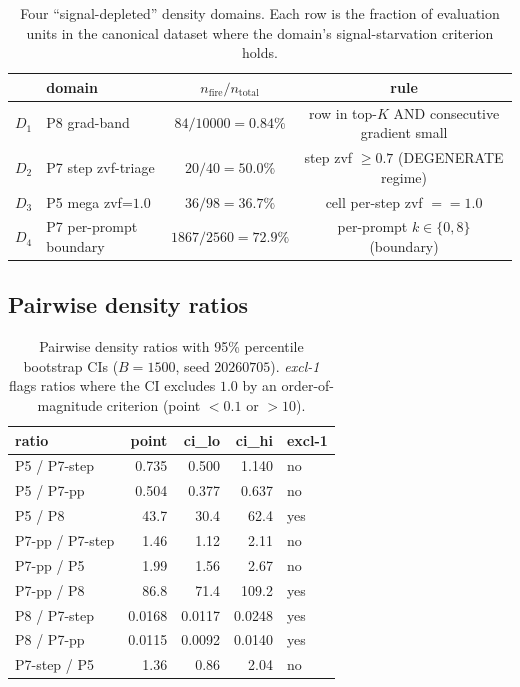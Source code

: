 \documentclass{article}
\begin{document}
\begin{table}[h]
\centering\small
\caption{Four ``signal-depleted'' density domains. Each row is the
fraction of evaluation units in the canonical dataset where the
domain's signal-starvation criterion holds.}
\label{tab:synth-four-domain}
\begin{tabular}{llcc}
\toprule
& domain & $n_{\mathrm{fire}} / n_{\mathrm{total}}$ & rule \\
\midrule
$D_1$ & P8 grad-band        & $84 / 10000 = 0.84\%$ & row in top-$K$ AND consecutive gradient small \\
$D_2$ & P7 step zvf-triage  & $20 / 40 = 50.0\%$    & step zvf $\geq 0.7$ (DEGENERATE regime) \\
$D_3$ & P5 mega zvf=$1.0$   & $36 / 98 = 36.7\%$    & cell per-step zvf $== 1.0$ \\
$D_4$ & P7 per-prompt boundary & $1867 / 2560 = 72.9\%$ & per-prompt $k \in \{0, 8\}$ (boundary) \\
\bottomrule
\end{tabular}
\end{table}

\subsection{Pairwise density ratios}

\begin{table}[h]
\centering\small
\caption{Pairwise density ratios with 95\% percentile bootstrap CIs
($B{=}1500$, seed $20260705$). \emph{excl-1} flags ratios where the
CI excludes $1.0$ by an order-of-magnitude criterion (point $< 0.1$
or $> 10$).}
\label{tab:synth-four-domain-ratios}
\begin{tabular}{lrrrl}
\toprule
ratio                       & point   & ci\_lo  & ci\_hi  & excl-1 \\
\midrule
P5 / P7-step                & 0.735   & 0.500   & 1.140   & no  \\
P5 / P7-pp                  & 0.504   & 0.377   & 0.637   & no  \\
P5 / P8                     & 43.7    & 30.4    & 62.4    & yes \\
P7-pp / P7-step             & 1.46    & 1.12    & 2.11    & no  \\
P7-pp / P5                  & 1.99    & 1.56    & 2.67    & no  \\
P7-pp / P8                  & 86.8    & 71.4    & 109.2   & yes \\
P8 / P7-step                & 0.0168  & 0.0117  & 0.0248  & yes \\
P8 / P7-pp                  & 0.0115  & 0.0092  & 0.0140  & yes \\
P7-step / P5                & 1.36    & 0.86    & 2.04    & no  \\
\bottomrule
\end{tabular}
\end{table}
\end{document}
